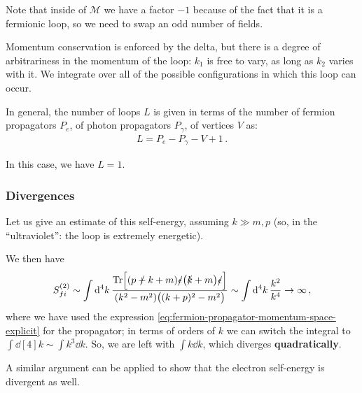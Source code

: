\documentclass[main.tex]{subfiles}
\begin{document}
Note that inside of \(\mathcal{M}\) we have a factor \(-1\) because of the fact that it is a fermionic loop, so we need to swap an odd number of fields. 

Momentum conservation is enforced by the delta, but there is a degree of arbitrariness in the momentum of the loop: \(k_1 \) is free to vary, as long as \(k_2 \) varies with it. We integrate over all of the possible configurations in which this loop can occur.  

In general, the number of loops \(L\) is given in terms of the number of fermion propagators \(P_e\), of photon propagators \(P_{\gamma }\), of vertices \(V\) as: 
%
\begin{align}
L = P_e - P_\gamma - V + 1
\,.
\end{align}

In this case, we have \(L =1 \).

\subsubsection{Divergences}

Let us give an estimate of this self-energy, assuming \(k \gg m, p\) (so, in the ``ultraviolet'': the loop is extremely energetic). 

We then have 
%
\begin{align}
S^{(2)}_{fi} \sim \int \dd[4]{k} \frac{\Tr[(\slashed{p+k} +m) \slashed{\epsilon } \qty(\slashed{k} + m) \slashed{\epsilon }]}{(k^2-m^2) \qty((k+p)^2- m^2)} \sim \int \dd[4]{k} \frac{k^2}{k^{4}} \to \infty 
\,,
\end{align}
%
where we have used the expression \eqref{eq:fermion-propagator-momentum-space-explicit} for the propagator; in terms of orders of \(k\) we can switch the integral to \(\int \dd[4]{k} \sim \int k^3 \dd{k} \). So, we are left with \(\int k \dd{k}\), which diverges \textbf{quadratically}. 

\begin{claim}
    A similar argument can be applied to show that the electron self-energy is divergent as well.
\end{claim}
\end{document}
